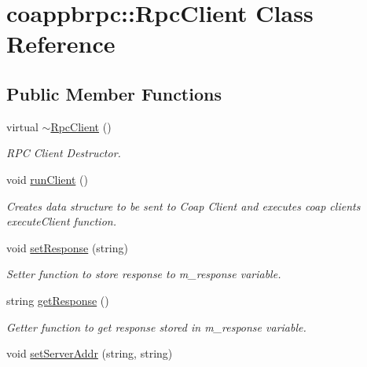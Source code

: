 \hypertarget{classcoappbrpc_1_1RpcClient}{}\section{coappbrpc\+:\+:Rpc\+Client Class Reference}
\label{classcoappbrpc_1_1RpcClient}
\subsection*{Public Member Functions}
\begin{DoxyCompactItemize}
\item 
\mbox{\label{classcoappbrpc_1_1RpcClient_a9b90b3ba0fef5ebd90748e454c1c7fd9}} 
virtual \hyperlink{classcoappbrpc_1_1RpcClient_a9b90b3ba0fef5ebd90748e454c1c7fd9}{$\sim$\+Rpc\+Client} ()
\begin{DoxyCompactList}\small\item\em R\+PC Client Destructor. \end{DoxyCompactList}\item 
\mbox{\label{classcoappbrpc_1_1RpcClient_a19f14a9f5ac45332f1656c0ab033dc09}} 
void \hyperlink{classcoappbrpc_1_1RpcClient_a19f14a9f5ac45332f1656c0ab033dc09}{run\+Client} ()
\begin{DoxyCompactList}\small\item\em Creates data structure to be sent to Coap Client and executes coap client\textquotesingle{}s execute\+Client function. \end{DoxyCompactList}\item 
void \hyperlink{classcoappbrpc_1_1RpcClient_a0f08b63838a62377d4470eb2a0259178}{set\+Response} (string)
\begin{DoxyCompactList}\small\item\em Setter function to store response to m\+\_\+response variable. \end{DoxyCompactList}\item 
string \hyperlink{classcoappbrpc_1_1RpcClient_ac79e3b2a76335a214cbe1c6f169d46c2}{get\+Response} ()
\begin{DoxyCompactList}\small\item\em Getter function to get response stored in m\+\_\+response variable. \end{DoxyCompactList}\item 
void \hyperlink{classcoappbrpc_1_1RpcClient_a69755d690a7f2d6373e191d359e48986}{set\+Server\+Addr} (string, string)

\end{DoxyCompactItemize}
